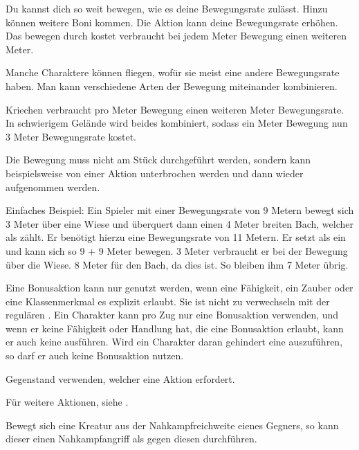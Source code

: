 Du kannst dich so weit bewegen, wie es deine Bewegungsrate zulässt. Hinzu können weitere Boni kommen. Die Aktion  kann deine Bewegungsrate erhöhen. Das bewegen durch  kostet verbraucht bei jedem Meter Bewegung einen weiteren Meter.

Manche Charaktere können fliegen, wofür sie meist eine andere Bewegungsrate haben. Man kann verschiedene Arten der Bewegung miteinander kombinieren.

Kriechen verbraucht pro Meter Bewegung einen weiteren Meter Bewegungsrate. In schwierigem Gelände wird beides kombiniert, sodass ein Meter Bewegung nun 3 Meter Bewegungsrate kostet.

Die Bewegung muss nicht am Stück durchgeführt werden, sondern kann beispielsweise von einer Aktion unterbrochen werden und dann wieder aufgenommen werden.


Einfaches Beispiel: Ein Spieler mit einer Bewegungsrate von 9 Metern bewegt sich 3 Meter über eine Wiese und überquert dann einen 4 Meter breiten Bach, welcher als  zählt. Er benötigt hierzu eine Bewegungsrate von 11 Metern. Er setzt als   ein und kann sich so 9 + 9 Meter bewegen. 3 Meter verbraucht er bei der Bewegung über die Wiese. 8 Meter für den Bach, da dies  ist. So bleiben ihm 7 Meter übrig.



Eine Bonusaktion kann nur genutzt werden, wenn eine Fähigkeit, ein Zauber oder eine Klassenmerkmal es explizit erlaubt. Sie ist nicht zu verwechseln mit der regulären . Ein Charakter kann pro Zug nur eine Bonusaktion verwenden, und wenn er keine Fähigkeit oder Handlung hat, die eine Bonusaktion erlaubt, kann er auch keine ausführen. Wird ein Charakter daran gehindert eine  auszuführen, so darf er auch keine Bonusaktion nutzen.



Gegenstand verwenden, welcher eine Aktion erfordert.

Für weitere Aktionen, siehe .



Bewegt sich eine Kreatur aus der Nahkampfreichweite eienes Gegners, so kann dieser einen Nahkampfangriff als  gegen diesen durchführen.



